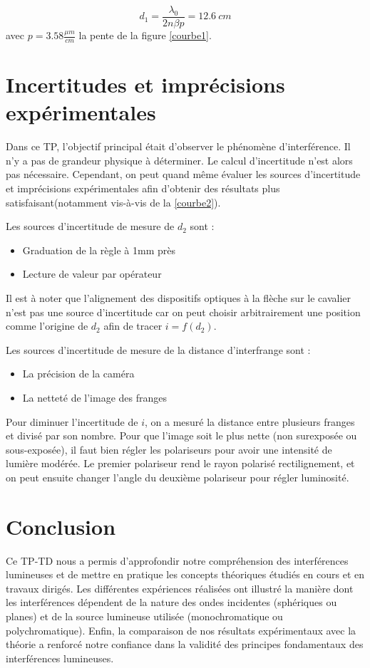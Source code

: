 \documentclass[11pt, a4paper]{article}
\begin{document}
$$
    d_1 =  \frac{\lambda_0}{2n\beta p} = 12.6\ cm
$$
avec $p=3.58 \frac{\mu m}{cm}$ la pente de la figure \ref{courbe1}.

\section{Incertitudes et imprécisions expérimentales}
Dans ce TP, l'objectif principal était d'observer le phénomène d'interférence. Il n'y a pas de grandeur physique à déterminer. Le calcul d'incertitude n'est alors pas nécessaire. Cependant, on peut quand même évaluer les sources d'incertitude et imprécisions expérimentales afin d'obtenir des résultats plus satisfaisant(notamment vis-à-vis de la \ref{courbe2}).

Les sources d'incertitude de mesure de $d_2$ sont :
\begin{itemize}
    \item Graduation de la règle à 1mm près
    \item Lecture de valeur par opérateur
\end{itemize}

Il est à noter que l'alignement des dispositifs optiques à la flèche sur le cavalier n'est pas une source d'incertitude car on peut choisir arbitrairement une position comme l'origine de $d_2$ afin de tracer $i=f(d_2)$. 

Les sources d'incertitude de mesure de la distance d'interfrange sont :
\begin{itemize}
    \item La précision de la caméra
    \item La netteté de l'image des franges
\end{itemize}

Pour diminuer l'incertitude de $i$, on a mesuré la distance entre plusieurs franges et divisé par son nombre. Pour que l'image soit le plus nette (non surexposée ou sous-exposée), il faut bien régler les polariseurs pour avoir une intensité de lumière modérée. Le premier polariseur rend le rayon polarisé rectilignement, et on peut ensuite changer l'angle du deuxième polariseur pour régler luminosité.

\section{Conclusion}
Ce TP-TD nous a permis d'approfondir notre compréhension des interférences lumineuses et de mettre en pratique les concepts théoriques étudiés en cours et en travaux dirigés. Les différentes expériences réalisées ont illustré la manière dont les interférences dépendent de la nature des ondes incidentes (sphériques ou planes) et de la source lumineuse utilisée (monochromatique ou polychromatique). Enfin, la comparaison de nos résultats expérimentaux avec la théorie a renforcé notre confiance dans la validité des principes fondamentaux des interférences lumineuses.
\end{document}
